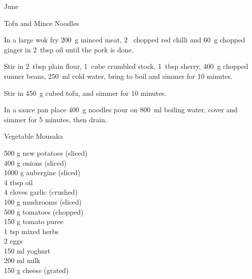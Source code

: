 \begin{menu}{June}
\begin{recipe}{2}{Tofu and Mince Noodles}
\begin{ingredients}
		\end{ingredients}
	
    \begin{instructions}
    \item 
        In a large wok fry
        200~g  minced meat,
        2~ chopped red chilli
        and
        60~g chopped ginger
        in
        2~tbsp  oil
        until the pork is done.
      \item 
        Stir in
        2~tbsp  plain flour,
        1~cube crumbled stock,
        1~tbsp  sherry,
        400~g chopped runner beans,
        250~ml  cold water,
        bring to boil
        and
        simmer for 10 minutes.
      \item 
        Stir in
        450~g cubed tofu,
        and
        simmer for 10 minutes.
      \item 
      In a 
      sauce pan
      place
      400~g  noodles
      pour on
      800~ml  boiling water,
      cover and simmer for 5 minutes, then drain.
    
    \end{instructions}
    \end{recipe}%
  
    \begin{recipe}{2}{Vegetable Mousaka}%
		\begin{ingredients}
		500 g new potatoes (sliced) \\
	400 g onions (sliced) \\
	1000 g aubergine (sliced) \\
	4 tbsp oil  \\
	4 cloves garlic (crushed) \\
	100 g mushrooms (sliced) \\
	500  g tomatoes (chopped) \\
	150 g tomato puree  \\
	1 tsp mixed herbs  \\
	2  eggs  \\
	150 ml yoghurt  \\
	200 ml milk  \\
	150 g cheese (grated) \\
	
		\end{ingredients}
	

\end{recipe}
\end{menu}
